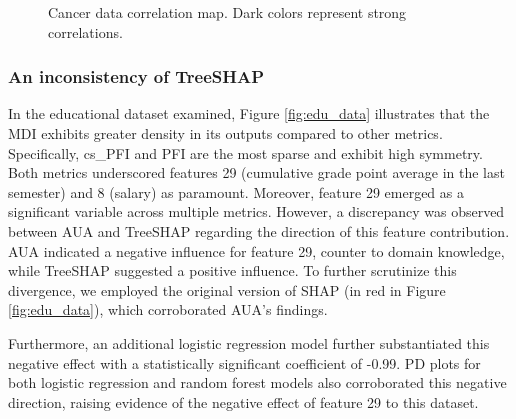 \begin{figure}[ht!]
\centering
  \caption{Cancer data correlation map. Dark colors represent strong correlations.}
    \label{fig:correlation}
\end{figure}


\subsubsection{An inconsistency of TreeSHAP}

In the educational dataset examined, Figure \ref{fig:edu_data} illustrates that the MDI exhibits greater density in its outputs compared to other metrics. Specifically, cs\_PFI and PFI are the most sparse and exhibit high symmetry. Both metrics underscored features 29 (cumulative grade point average in the last semester) and 8 (salary) as paramount. Moreover, feature 29 emerged as a significant variable across multiple metrics. However, a discrepancy was observed between AUA and TreeSHAP regarding the direction of this feature contribution. AUA indicated a negative influence for feature 29, counter to domain knowledge, while TreeSHAP suggested a positive influence. To further scrutinize this divergence, we employed the original version of SHAP (in red in Figure \ref{fig:edu_data}), which corroborated AUA's findings.

Furthermore, an additional logistic regression model further substantiated this negative effect with a statistically significant coefficient of -0.99. PD plots for both logistic regression and random forest models also corroborated this negative direction, raising evidence of the negative effect of feature 29 to this dataset. 

